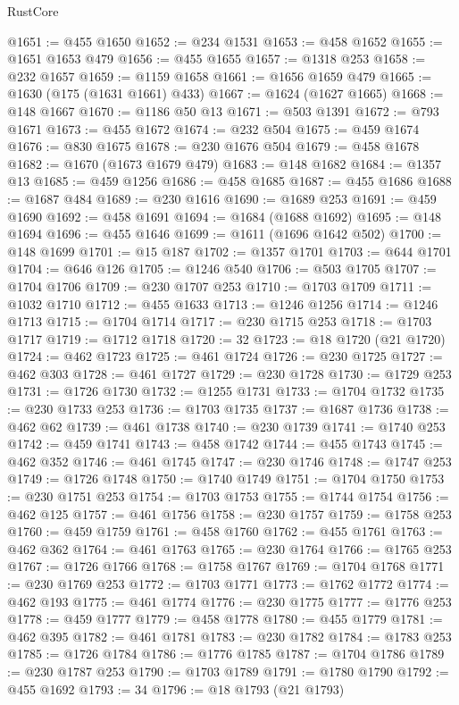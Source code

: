 \begin{lexlean}{RustCore}
\begin{coremodule}
@1651 := @455 @1650
@1652 := @234 @1531
@1653 := @458 @1652
@1655 := @1651 @1653 @479
@1656 := @455 @1655
@1657 := @1318 @253
@1658 := @232 @1657
@1659 := @1159 @1658
@1661 := @1656 @1659 @479
@1665 := @1630 (@175 (@1631 @1661) @433)
@1667 := @1624 (@1627 @1665)
@1668 := @148 @1667
@1670 := @1186 @50 @13
@1671 := @503 @1391
@1672 := @793 @1671
@1673 := @455 @1672
@1674 := @232 @504
@1675 := @459 @1674
@1676 := @830 @1675
@1678 := @230 @1676 @504
@1679 := @458 @1678
@1682 := @1670 (@1673 @1679 @479)
@1683 := @148 @1682
@1684 := @1357 @13
@1685 := @459 @1256
@1686 := @458 @1685
@1687 := @455 @1686
@1688 := @1687 @484
@1689 := @230 @1616
@1690 := @1689 @253
@1691 := @459 @1690
@1692 := @458 @1691
@1694 := @1684 (@1688 @1692)
@1695 := @148 @1694
@1696 := @455 @1646
@1699 := @1611 (@1696 @1642 @502)
@1700 := @148 @1699
@1701 := @15 @187
@1702 := @1357 @1701
@1703 := @644 @1701
@1704 := @646 @126
@1705 := @1246 @540
@1706 := @503 @1705
@1707 := @1704 @1706
@1709 := @230 @1707 @253
@1710 := @1703 @1709
@1711 := @1032 @1710
@1712 := @455 @1633
@1713 := @1246 @1256
@1714 := @1246 @1713
@1715 := @1704 @1714
@1717 := @230 @1715 @253
@1718 := @1703 @1717
@1719 := @1712 @1718
@1720 := 32
@1723 := @18 @1720 (@21 @1720)
@1724 := @462 @1723
@1725 := @461 @1724
@1726 := @230 @1725
@1727 := @462 @303
@1728 := @461 @1727
@1729 := @230 @1728
@1730 := @1729 @253
@1731 := @1726 @1730
@1732 := @1255 @1731
@1733 := @1704 @1732
@1735 := @230 @1733 @253
@1736 := @1703 @1735
@1737 := @1687 @1736
@1738 := @462 @62
@1739 := @461 @1738
@1740 := @230 @1739
@1741 := @1740 @253
@1742 := @459 @1741
@1743 := @458 @1742
@1744 := @455 @1743
@1745 := @462 @352
@1746 := @461 @1745
@1747 := @230 @1746
@1748 := @1747 @253
@1749 := @1726 @1748
@1750 := @1740 @1749
@1751 := @1704 @1750
@1753 := @230 @1751 @253
@1754 := @1703 @1753
@1755 := @1744 @1754
@1756 := @462 @125
@1757 := @461 @1756
@1758 := @230 @1757
@1759 := @1758 @253
@1760 := @459 @1759
@1761 := @458 @1760
@1762 := @455 @1761
@1763 := @462 @362
@1764 := @461 @1763
@1765 := @230 @1764
@1766 := @1765 @253
@1767 := @1726 @1766
@1768 := @1758 @1767
@1769 := @1704 @1768
@1771 := @230 @1769 @253
@1772 := @1703 @1771
@1773 := @1762 @1772
@1774 := @462 @193
@1775 := @461 @1774
@1776 := @230 @1775
@1777 := @1776 @253
@1778 := @459 @1777
@1779 := @458 @1778
@1780 := @455 @1779
@1781 := @462 @395
@1782 := @461 @1781
@1783 := @230 @1782
@1784 := @1783 @253
@1785 := @1726 @1784
@1786 := @1776 @1785
@1787 := @1704 @1786
@1789 := @230 @1787 @253
@1790 := @1703 @1789
@1791 := @1780 @1790
@1792 := @455 @1692
@1793 := 34
@1796 := @18 @1793 (@21 @1793)

\end{coremodule}
\end{lexlean}
